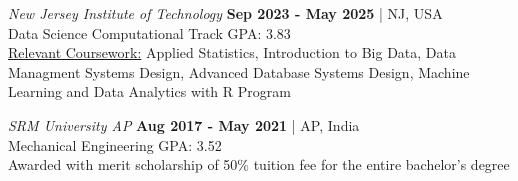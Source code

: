  \textit{New Jersey Institute of Technology} {\hfill \textbf{Sep 2023 - May 2025} | NJ, USA} \\
{Data Science Computational Track \hfill GPA: 3.83} \\
{\underline{Relevant Coursework:} Applied Statistics, Introduction to Big Data, Data Managment Systems Design, Advanced Database Systems Design, Machine Learning and Data Analytics with R Program}


 \textit{SRM University AP} {\hfill \textbf{Aug 2017 - May 2021} | AP, India} \\
{Mechanical Engineering \hfill GPA: 3.52} \\
{Awarded with merit scholarship of 50\% tuition fee for the entire bachelor's degree} \\










